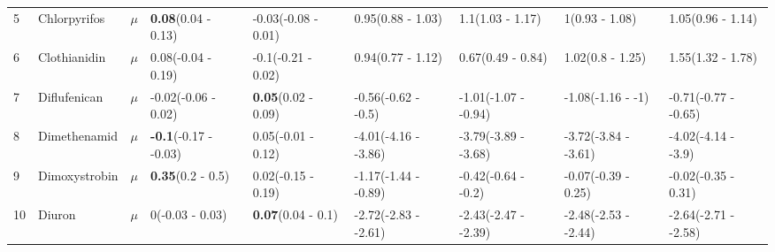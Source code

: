 \begin{longtable}{lp{2cm}p{0.6cm}p{1.8cm}p{1.8cm}p{1.8cm}p{1.8cm}p{1.8cm}p{1.8cm}}
  5 & Chlorpyrifos & $\mu$ & \textbf{0.08}\newline (0.04 - 0.13) & -0.03\newline (-0.08 - 0.01) & 0.95\newline (0.88 - 1.03) & 1.1\newline (1.03 - 1.17) & 1\newline (0.93 - 1.08) & 1.05\newline (0.96 - 1.14) \\ 
  6 & Clothianidin & $\mu$ & 0.08\newline (-0.04 - 0.19) & -0.1\newline (-0.21 - 0.02) & 0.94\newline (0.77 - 1.12) & 0.67\newline (0.49 - 0.84) & 1.02\newline (0.8 - 1.25) & 1.55\newline (1.32 - 1.78) \\ 
  7 & Diflufenican & $\mu$ & -0.02\newline (-0.06 - 0.02) & \textbf{0.05}\newline (0.02 - 0.09) & -0.56\newline (-0.62 - -0.5) & -1.01\newline (-1.07 - -0.94) & -1.08\newline (-1.16 - -1) & -0.71\newline (-0.77 - -0.65) \\ 
  8 & Dimethenamid & $\mu$ & \textbf{-0.1}\newline (-0.17 - -0.03) & 0.05\newline (-0.01 - 0.12) & -4.01\newline (-4.16 - -3.86) & -3.79\newline (-3.89 - -3.68) & -3.72\newline (-3.84 - -3.61) & -4.02\newline (-4.14 - -3.9) \\ 
  9 & Dimoxystrobin & $\mu$ & \textbf{0.35}\newline (0.2 - 0.5) & 0.02\newline (-0.15 - 0.19) & -1.17\newline (-1.44 - -0.89) & -0.42\newline (-0.64 - -0.2) & -0.07\newline (-0.39 - 0.25) & -0.02\newline (-0.35 - 0.31) \\ 
  10 & Diuron & $\mu$ & 0\newline (-0.03 - 0.03) & \textbf{0.07}\newline (0.04 - 0.1) & -2.72\newline (-2.83 - -2.61) & -2.43\newline (-2.47 - -2.39) & -2.48\newline (-2.53 - -2.44) & -2.64\newline (-2.71 - -2.58) \\ 

\end{longtable}
